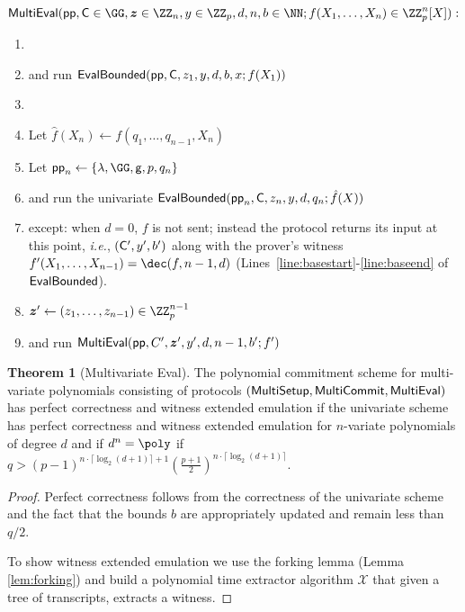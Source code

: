 \documentclass{article}
\theoremstyle{definition}
\newtheorem{theorem}{Theorem}
\begin{document}
 \begin{mdframed}
\begin{minipage}{\textwidth}
			$\pro{MultiEval}(\crs, \gr{C}\in \GG, \boldsymbol{z}\in \ZZ_n,y \in \ZZ_p, d,n,b \in \NN; f(X_1,\dots,X_n)\in \ZZ_p^n[X]) :$ 			\begin{enumerate}[nolistsep]
			\item {} 
			\item \pcind[1] \prover and \verifier run $\textsf{{EvalBounded}}(\textsf{pp},\mathsf{C},z_1,y,d,b,x;f(X_1))$ 
			\item \pcelse
			\item \pcind[1] Let $\hat{f}(X_n)\gets f(q_1,\dots,q_{n-1},X_n)$
			\item \pcind[1] Let $\crs_n \gets \{\lambda,\GG,\gr{g},p,q_n\}$
			\item \pcind[1] \prover and \verifier run the univariate $\textsf{{EvalBounded}}(\textsf{pp}_n,\mathsf{C},z_n,y,d,q_n;\hat{f}(X))$
			\item \pcind[2] except: when $d=0$, $f$ is not sent; instead the protocol returns its input at this point, \emph{i.e.}, $(\mathsf{C}',y',b')$ along with the prover's witness $f'(X_1,\dots,X_{n-1})=\dec(f,n-1,d)$ (Lines~\ref{line:basestart}-\ref{line:baseend} of $\textsf{{EvalBounded}}$). 
			\item \pcind[1]$\boldsymbol{z}'\gets (z_1,\dots,z_{n-1})\in \ZZ_p^{n-1}$
			\item \pcind[1]\prover and \verifier run $\textsf{{MultiEval}}(\textsf{pp},C',\boldsymbol{z}',y',d,n-1,b';f')$
		    \end{enumerate}
      \end{minipage}
\end{mdframed}
\begin{theorem}[Multivariate Eval]
	The polynomial commitment scheme for multi-variate polynomials consisting of protocols $(\textsf{{MultiSetup}},\textsf{{MultiCommit}},\textsf{{MultiEval}})$ has perfect correctness and witness extended emulation if the univariate scheme has perfect correctness and witness extended emulation for $n$-variate polynomials of degree $d$ and if $d^n=\poly$ if $q>(p-1)^{n\cdot \lceil \log_2(d+1)\rceil+1}(\frac{p+1}{2})^{n \cdot \lceil \log_2(d+1)\rceil}$.
\end{theorem}
\begin{proof}
	Perfect correctness follows from the correctness of the univariate scheme and the fact that the bounds $b$ are appropriately updated and remain less than $q/2$.
	
	To show witness extended emulation we use the forking lemma (Lemma \ref{lem:forking}) and build a polynomial time extractor algorithm $\mathcal{X}$ that given a tree of transcripts, extracts a witness.
\end{proof}
\end{document}
